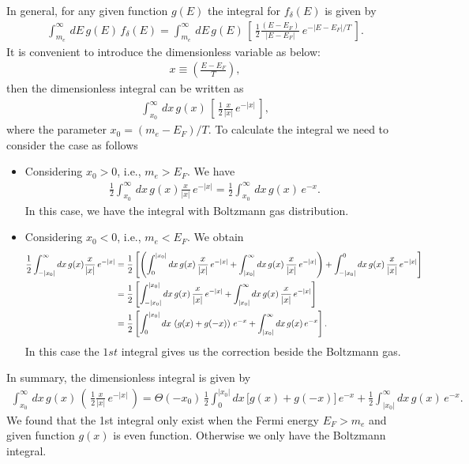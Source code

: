 \documentclass[onecolumn,preprintnumbers,amsmath,amssymb]{revtex4}
\begin{document}
In general, for any given function $g(E)$ the integral for $f_\delta(E)$ is given by
\begin{align}
\label{Integral001}
\int^{\infty}_{m_e}\,dE\,g(E)\,f_\delta(E)=\int^\infty_{m_e}\,dE\,g(E)\,\left[\,\frac{1}{2}\frac{(E-E_F)}{|E-E_F|}\,e^{-|E-E_F|/T}\,\right].
\end{align}
It is convenient to introduce the dimensionless variable as below:
\begin{align}
x\equiv\left(\frac{E-E_F}{T}\right),
\end{align}
then the dimensionless integral can be written as
\begin{align}
\int^\infty_{x_0}\,dx\,g(x)\,\left[\,\frac{1}{2}\frac{x}{|x|}\,e^{-|x|}\,\right],
\end{align}
where the parameter $x_0=(m_e-E_F)/T$. To calculate the integral we need to consider the case as follows
\begin{itemize}
  \item Considering $x_0>0$, i.e., $m_e>E_F$. We have
  \begin{align}
  \frac{1}{2}\int^\infty_{x_0}\,dx\,g(x)\frac{x}{|x|}\,e^{-|x|}=\frac{1}{2}\int^{\infty}_{x_0}\,dx\,g(x)\,e^{-x}.
  \end{align}
  In this case, we have the integral with Boltzmann gas distribution.
  \item Considering $x_0<0$, i.e., $m_e<E_F$. We obtain
  \begin{align}
   \frac{1}{2}\int^\infty_{-|x_0|}dx\,g(x)\frac{x}{|x|}\,e^{-|x|}&=\frac{1}{2}\left[\left(\int_0^{|x_0|}dx\,g(x)\,\frac{x}{|x|}\,e^{-|x|}+\int^\infty_{|x_0|}dx\,g(x)\,\frac{x}{|x|}\,e^{-|x|}\right)+\int^0_{-|x_0|}dx\,g(x)\,\frac{x}{|x|}\,e^{-|x|}\right]\notag\\
   &=\frac{1}{2}\left[\int_{-|x_0|}^{|x_0|}dx\,g(x)\,\frac{x}{|x|}\,e^{-|x|}+\int^\infty_{|x_0|}dx\,g(x)\,\frac{x}{|x|}\,e^{-|x|}\right]\notag\\
   &=\frac{1}{2}\left[\int_{0}^{|x_0|}dx\,\left(g(x)+g(-x)\right)\,e^{-x}+\int^\infty_{|x_0|}dx\,g(x)\,e^{-x}\right].
  \end{align}
  In this case the $1st$ integral gives us the correction beside the Boltzmann gas.
\end{itemize}
In summary, the dimensionless integral is given by
\begin{align}
\int^\infty_{x_0}\,dx\,g(x)\,\left(\,\frac{1}{2}\frac{x}{|x|}\,e^{-|x|}\,\right)=\Theta(-x_0)\,\frac{1}{2}\int_{0}^{|x_0|}dx\,\bigg[g(x)+g(-x)\bigg]\,e^{-x}+\frac{1}{2}\int^\infty_{|x_0|}dx\,g(x)\,e^{-x}.
\end{align}
We found that the 1st  integral only exist when the Fermi energy $E_F>m_e$ and given function $g(x)$ is even function. Otherwise we only have the Boltzmann integral.
\end{document}
